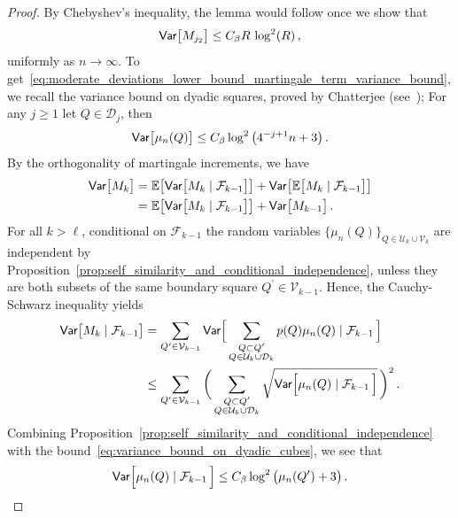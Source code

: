 \documentclass[11pt]{amsart}
\theoremstyle{definition}
\theoremstyle{remark}
\numberwithin{equation}{section}
\newcommand{\bE}{\mathbb E}
\newcommand{\Var}{{\sf Var}}
\begin{document}
	\begin{proof}
		By Chebyshev's inequality, the lemma would follow once we show that
		\begin{equation}
			\label{eq:moderate_deviations_lower_bound_martingale_term_variance_bound}
			\Var\big[M_{j_2}\big] \le C_\beta R\,  \log^2(R) \, ,
		\end{equation}
		uniformly as $n\to \infty$. To get~\eqref{eq:moderate_deviations_lower_bound_martingale_term_variance_bound}, we recall the variance bound on dyadic squares, proved by Chatterjee (see~\cite[Lemma~3.8]{chatterjee}); For any $j\ge 1$ let $Q\in \mathcal{D}_j$, then
		\begin{equation}
			\label{eq:variance_bound_on_dyadic_cubes}
			\Var\big[\mu_n(Q)\big] \le C_\beta \log^2\big(4^{-j+1} n + 3\big) \, .
		\end{equation}
		By the orthogonality of martingale increments, we have
		\begin{align}
			\nonumber \label{eq:martingale_propoerty_for_conditional_variance}
			\Var\big[M_k\big] &= \bE\big[\Var\big[M_k \mid \mathcal{F}_{k-1}\big]\big] + \Var\big[\bE\big[M_k \mid \mathcal{F}_{k-1}\big]\big] \\ & =\bE\big[\Var\big[M_k \mid \mathcal{F}_{k-1}\big]\big] + \Var\big[M_{k-1}\big] \, .
		\end{align}
		For all $k>\ell$, conditional on $\mathcal{F}_{k-1}$ the random variables $\{\mu_n(Q)\}_{Q\in \mathcal{U}_{k} \cup \mathcal{V}_k}$ are independent by Proposition~\ref{prop:self_similarity_and_conditional_independence}, unless they are both subsets of the same boundary square $Q^\prime \in \mathcal{V}_{k-1}$. Hence, the Cauchy-Schwarz inequality yields
		\begin{align*}
			\Var\big[M_k \mid \mathcal{F}_{k-1}\big] & = \sum_{Q^\prime\in \mathcal{V}_{k-1}} \Var \Big[\sum_{\substack{Q\subset Q^\prime \\ Q\in \mathcal{U}_{k} \cup \mathcal{D}_{k}}} p(Q) \mu_n(Q) \mid \mathcal{F}_{k-1} \, \Big] \\
			& \leq \sum_{Q^\prime\in \mathcal{V}_{k-1}} \bigg(\sum_{\substack{Q\subset Q^\prime \\ Q\in \mathcal{U}_{k} \cup \mathcal{D}_{k}}} \sqrt{\Var \Big[ \mu_n(Q) \mid \mathcal{F}_{k-1} \, \Big]} \, \bigg)^2 \, .
		\end{align*}
		Combining Proposition~\ref{prop:self_similarity_and_conditional_independence} with the bound~\eqref{eq:variance_bound_on_dyadic_cubes}, we see that
		\[
		\Var \Big[ \mu_n(Q) \mid \mathcal{F}_{k-1} \, \Big] \le C_\beta \log^2\big( \mu_n(Q^\prime) + 3 \big)  \, .
\]
\end{proof}
\end{document}
